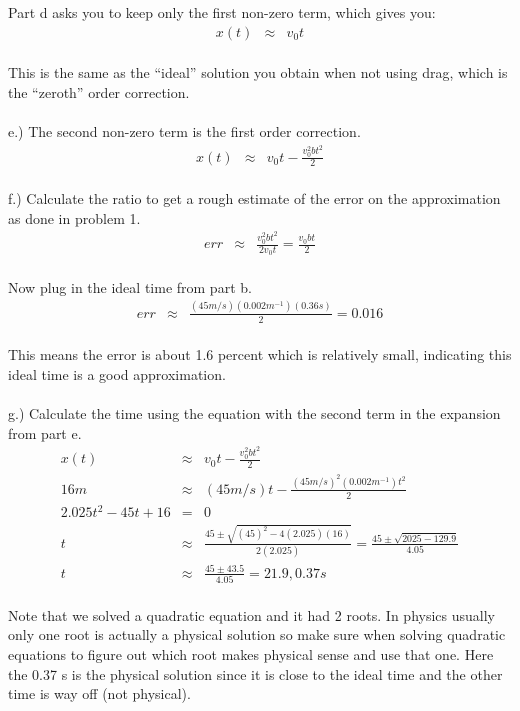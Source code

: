 \documentclass[11pt]{amsart}
\begin{document}
Part d asks you to keep only the first non-zero term, which gives you: \\ 
\begin{eqnarray*} 
x(t) &\approx& v_{0}t 
\end{eqnarray*} \\
This is the same as the ``ideal'' solution you obtain when not using drag, which is the ``zeroth'' order correction. \\ \\
e.) The second non-zero term is the first order correction. \\ 
\begin{eqnarray*}
x(t) &\approx& v_{0}t -\frac{v_{0}^{2}bt^{2}}{2} 
\end{eqnarray*}  \\
f.) Calculate the ratio to get a rough estimate of the error on the approximation as done in problem 1. \\ 
\begin{eqnarray*}
err &\approx& \frac{v_{0}^{2}bt^{2}}{2v_{0}t} = \frac{v_{0}bt}{2} 
\end{eqnarray*} \\
Now plug in the ideal time from part b. \\ 
\begin{eqnarray*}
err &\approx& \frac{(45m/s)(0.002m^{-1})(0.36s)}{2} = 0.016 
\end{eqnarray*} \\
This means the error is about 1.6 percent which is relatively small, indicating this ideal time is a good approximation. \\ \\
g.) Calculate the time using the equation with the second term in the expansion from part e. \\ 
\begin{eqnarray*}
x(t) &\approx&  v_{0}t -\frac{v_{0}^{2}bt^{2}}{2} \\
16m &\approx& (45m/s)t - \frac{(45m/s)^{2}(0.002m^{-1})t^{2}}{2} \\
2.025t^{2} - 45t +16 &=& 0 \\
t &\approx& \frac{45±\sqrt{(45)^{2}-4(2.025)(16)}}{2(2.025)} = \frac{45±\sqrt{2025-129.9}}{4.05} \\
t&\approx& \frac{45±43.5}{4.05} = 21.9, 0.37 s 
\end{eqnarray*} \\
Note that we solved a quadratic equation and it had 2 roots. In physics usually only one root is actually a physical solution so make sure when solving quadratic equations to figure out which root makes physical sense and use that one. Here the 0.37 s is the physical solution since it is close to the ideal time and the other time is way off (not physical). \\ 
\end{document}
